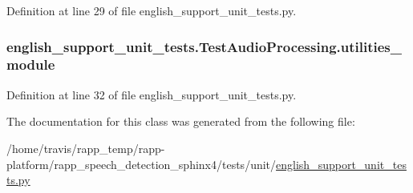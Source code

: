 Definition at line 29 of file english\-\_\-support\-\_\-unit\-\_\-tests.\-py.

\hypertarget{classenglish__support__unit__tests_1_1TestAudioProcessing_a107b29275347e41f4d9b65d3934b0188}{
\subsubsection[{utilities\-\_\-module}]{\setlength{\rightskip}{0pt plus 5cm}english\-\_\-support\-\_\-unit\-\_\-tests.\-Test\-Audio\-Processing.\-utilities\-\_\-module}}\label{classenglish__support__unit__tests_1_1TestAudioProcessing_a107b29275347e41f4d9b65d3934b0188}


Definition at line 32 of file english\-\_\-support\-\_\-unit\-\_\-tests.\-py.



The documentation for this class was generated from the following file\-:\begin{DoxyCompactItemize}
\item 
/home/travis/rapp\-\_\-temp/rapp-\/platform/rapp\-\_\-speech\-\_\-detection\-\_\-sphinx4/tests/unit/\hyperlink{english__support__unit__tests_8py}{english\-\_\-support\-\_\-unit\-\_\-tests.\-py}\end{DoxyCompactItemize}

